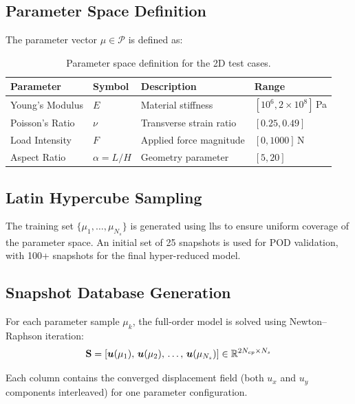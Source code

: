 \subsection{Parameter Space Definition}

The parameter vector $\mu \in \mathcal{P}$ is defined as:

\begin{table}[H]
\centering
\caption{Parameter space definition for the 2D test cases.}
\label{tab:param-space}
\begin{tabular}{llll}
\toprule
\textbf{Parameter} & \textbf{Symbol} & \textbf{Description} & \textbf{Range} \\
\midrule
Young's Modulus & $E$ & Material stiffness & $[10^6, 2 \times 10^8]$\,Pa \\
Poisson's Ratio & $\nu$ & Transverse strain ratio & $[0.25, 0.49]$ \\
Load Intensity & $F$ & Applied force magnitude & $[0, 1000]$\,N \\
Aspect Ratio & $\alpha = L/H$ & Geometry parameter & $[5, 20]$ \\
\bottomrule
\end{tabular}
\end{table}

\subsection{Latin Hypercube Sampling}

The training set $\{\mu_1, \ldots, \mu_{N_s}\}$ is generated using \acrfull{lhs} to ensure uniform coverage of the parameter space. An initial set of 25 snapshots is used for POD validation, with 100+ snapshots for the final hyper-reduced model.

\subsection{Snapshot Database Generation}

For each parameter sample $\mu_k$, the full-order model is solved using Newton--Raphson iteration:
\begin{equation}
    \mathbf{S} = \left[\bm{u}(\mu_1), \, \bm{u}(\mu_2), \, \ldots, \, \bm{u}(\mu_{N_s})\right] \in \mathbb{R}^{2N_{cp} \times N_s}
\end{equation}

Each column contains the converged displacement field (both $u_x$ and $u_y$ components interleaved) for one parameter configuration.

